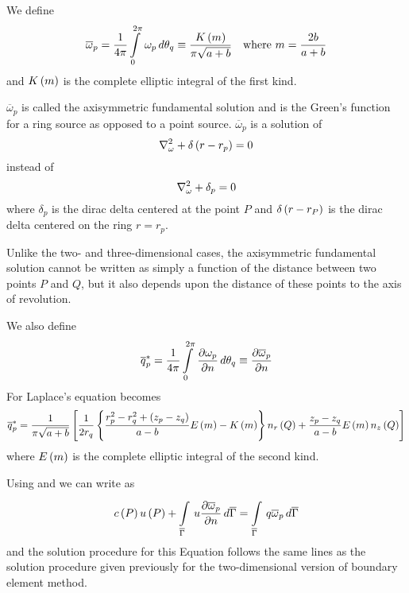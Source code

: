 We define
\begin{equation}
  \overline{\omega}_{p} = \dfrac{1}{4 \pi}   \displaystyle\int\limits_{0}^{2 \pi} \,\omega_{p}\,d\theta_{q}  \equiv \dfrac{ K\left( m \right) }{\pi \sqrt{a+b}} \quad 
  \text{where } m=\dfrac{2b}{a+b}
  \label{eqn:defined}
\end{equation}
and $ K\left( m \right) $ is the complete elliptic integral of the first kind.

$\overline{\omega}_{p}$ is called the axisymmetric fundamental solution and is
the Green's function for a ring source as opposed to a point source. \ie
$\overline{\omega}_{p}$ is a solution of
\begin{equation}
  \laplacian{\omega}+\fnof{\delta}{r-r_{p}} =0
  \label{eqn:solution}
\end{equation}
instead of
\begin{equation}
  \laplacian{\omega}+\delta_{p} =0
  \label{eqn:notsol}
\end{equation}
where $\delta_{p}$ is the dirac delta centered at the point $P$ and
$ \delta\left( r-r_{P} \right) $ is the dirac delta centered on the ring $r=r_{p}$.

Unlike the two- and three-dimensional cases, the axisymmetric fundamental
solution cannot be written as simply a function of the distance between two
points $P$ and $Q$, but it also depends upon the distance of these points to
the axis of revolution.

We also define
\begin{equation}  
  \overline{q}_{p}^{*} = \dfrac{1}{4 \pi}  \displaystyle\int\limits_{0}^{2 \pi} \, \dfrac{\partial \omega_{p}}{\partial n} \,d\theta_{q}  \equiv  \dfrac{\partial \overline{\omega}_{p}}{\partial n} 
 \label{eqn:qeq}
\end{equation}
For Laplace's equation  becomes
\begin{equation} 
  \overline{q}_{p}^{*} = \dfrac{1}{\pi \sqrt{a+b}} \left[ \dfrac{1}{2r_{q}}
    \left\{ \dfrac{r_{p}^{2}-r_{q}^{2} +\left( z_{p}-z_{q} \right)}{a-b}  E\left( m \right)  -
       K\left( m \right)  \right\}  n_{r}\left( Q \right)  + \dfrac{z_{p}-z_{q}}{a-b}
     E\left( m \right)  n_{z}\left( Q \right)  \right] 
  \label{eqn:number98}
\end{equation}
where $ E\left( m \right) $ is the complete elliptic integral of the second kind.

Using  and  we can write  as
\begin{equation}
   c\left( P \right)   u\left( P \right)  +    \displaystyle\int\limits_{\overline{\Gamma}}^{} \,u  \dfrac{\partial \overline{\omega}_{p}}{\partial n} \,d\overline{\Gamma}   =    \displaystyle\int\limits_{\overline{\Gamma}}^{} \,q \overline{\omega}_{p}\,d\overline{\Gamma}  
  \label{eqn:BoInteq2}
\end{equation}
and the solution procedure for this Equation follows the same lines as the
solution procedure given previously for the two-dimensional version of
boundary element method.

